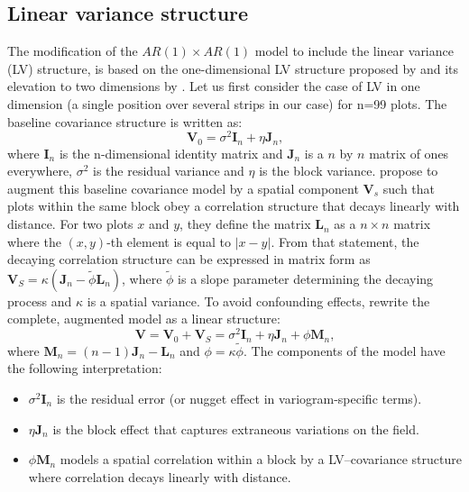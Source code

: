 \subsection{Linear variance structure}
The modification of the $AR(1) \times AR(1)$ model to include the linear variance (LV) structure, is based on the one-dimensional LV structure proposed by \textcite{williams_neighbour_1986} and its elevation to two dimensions by \textcite{piepho_linear_2010}.
Let us first consider the case of LV in one dimension (a single position over several strips in our case) for n=99 plots. The baseline covariance structure is written as:
\begin{equation}
	\boldsymbol{V}_{0}=\sigma^{2} \boldsymbol{I}_{n}+\eta \boldsymbol{J}_{n}
	\text{,}
\end{equation}
where $\boldsymbol{I}_{n}$ is the n-dimensional identity matrix and $\boldsymbol{J}_{n}$ is a $n$ by $n$ matrix of ones everywhere, $\sigma^2$ is the residual variance and $\eta$ is the block variance. 
\textcite{williams_neighbour_1986} propose to augment this baseline covariance model by a spatial component $\boldsymbol{V}_{s}$ such that plots within the same block obey a correlation structure that decays linearly with distance. 
For two plots $x$ and $y$, they define the matrix $\boldsymbol{L}_n$ as a $n\times n$ matrix where the $(x,y)$-th element is equal to $|x-y|$. 
From that statement, the decaying correlation structure can be expressed in matrix form as $\boldsymbol{V}_{S}=\kappa\left(\boldsymbol{J}_{n}-\tilde{\phi} \boldsymbol{L}_{n}\right)$, where $\tilde{\phi}$ is a slope parameter determining the decaying process and $\kappa$ is a spatial variance. 
To avoid confounding effects, \textcite{williams_neighbour_1986} rewrite the complete, augmented model as a linear structure:
\begin{equation}
	\boldsymbol{V}=\boldsymbol{V}_{0}+\boldsymbol{V}_{S}=\sigma^{2} \boldsymbol{I}_{n}+\eta \boldsymbol{J}_{n}+\phi \boldsymbol{M}_{n}
	\text{,}
\end{equation}
where $\boldsymbol{M}_n = (n-1)\boldsymbol{J}_n - \boldsymbol{L}_n$ and $\phi = \kappa\tilde{\phi}$. The components of the model have the following interpretation: 
\begin{itemize}
	\item $\sigma^{2} \boldsymbol{I}_{n}$ is the residual error (or nugget effect in variogram-specific terms).
	\item $\eta \boldsymbol{J}_n$ is the block effect that captures extraneous variations on the field.
	\item $\phi \boldsymbol{M}_n$ models a spatial correlation within a block by a LV–covariance structure where correlation decays linearly with distance.
\end{itemize}

